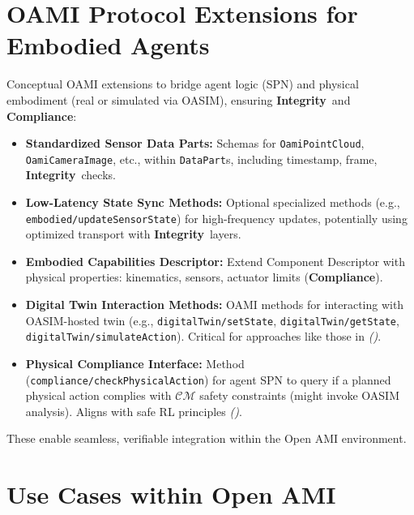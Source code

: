 \documentclass[12pt,a4paper]{report}
\renewcommand{\citep}[1]{\textit{\scriptsize{(\cite{#1})}}}
\newcommand{\Integrity}{\textbf{Integrity}}
\begin{document}
	\section{OAMI Protocol Extensions for Embodied Agents}
	\label{app:oasim_embodied_extensions_details} %
	
	Conceptual OAMI extensions to bridge agent logic (SPN) and physical embodiment (real or simulated via OASIM), ensuring \Integrity\ and \textbf{Compliance}:
	\begin{itemize}
		\item \textbf{Standardized Sensor Data Parts:} Schemas for \texttt{OamiPointCloud}, \texttt{OamiCameraImage}, etc., within \texttt{DataPart}s, including timestamp, frame, \Integrity\ checks.
		\item \textbf{Low-Latency State Sync Methods:} Optional specialized methods (e.g., \texttt{embodied/updateSensorState}) for high-frequency updates, potentially using optimized transport with \Integrity\ layers.
		\item \textbf{Embodied Capabilities Descriptor:} Extend Component Descriptor with physical properties: kinematics, sensors, actuator limits (\textbf{Compliance}).
		\item \textbf{Digital Twin Interaction Methods:} OAMI methods for interacting with OASIM-hosted twin (e.g., \texttt{digitalTwin/setState}, \texttt{digitalTwin/getState}, \texttt{digitalTwin/simulateAction}). Critical for approaches like those in \citep{Berg2025DigitalTwin}.
		\item \textbf{Physical Compliance Interface:} Method (\texttt{compliance/checkPhysicalAction}) for agent SPN to query if a planned physical action complies with $\mathcal{CM}$ safety constraints (might invoke OASIM analysis). Aligns with safe RL principles \citep{Constraint_RL_Survey_2024, Cao_PhyDRL_2024}.
	\end{itemize}
	These enable seamless, verifiable integration within the Open AMI environment.
	
	\section{Use Cases within Open AMI}
	\label{app:oasim_use_cases}
	
\end{document}
